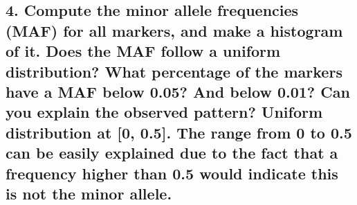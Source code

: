 \documentclass[
]{article}
\begin{document}
\hypertarget{compute-the-minor-allele-frequencies-maf-for-all-markers-and-make-a-histogram-of-it.-does-the-maf-follow-a-uniform-distribution-what-percentage-of-the-markers-have-a-maf-below-0.05-and-below-0.01-can-you-explain-the-observed-pattern-uniform-distribution-at-0-0.5.-the-range-from-0-to-0.5-can-be-easily-explained-due-to-the-fact-that-a-frequency-higher-than-0.5-would-indicate-this-is-not-the-minor-allele.}{%
\subsection{4. Compute the minor allele frequencies (MAF) for all
markers, and make a histogram of it. Does the MAF follow a uniform
distribution? What percentage of the markers have a MAF below 0.05? And
below 0.01? Can you explain the observed pattern? Uniform distribution
at {[}0, 0.5{]}. The range from 0 to 0.5 can be easily explained due to
the fact that a frequency higher than 0.5 would indicate this is not the
minor
allele.}\label{compute-the-minor-allele-frequencies-maf-for-all-markers-and-make-a-histogram-of-it.-does-the-maf-follow-a-uniform-distribution-what-percentage-of-the-markers-have-a-maf-below-0.05-and-below-0.01-can-you-explain-the-observed-pattern-uniform-distribution-at-0-0.5.-the-range-from-0-to-0.5-can-be-easily-explained-due-to-the-fact-that-a-frequency-higher-than-0.5-would-indicate-this-is-not-the-minor-allele.}}
\end{document}

